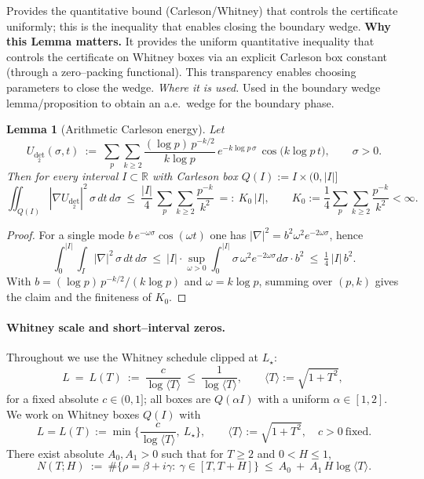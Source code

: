 \documentclass[11pt]{article}
\newtheorem{lemma}{Lemma}[section]
\theoremstyle{definition}
\theoremstyle{remark}
\newcommand{\R}{\mathbb{R}}
\begin{document}
\vspace{1.0cm}
Provides the quantitative bound (Carleson/Whitney) that controls the certificate uniformly;
this is the inequality that enables closing the boundary wedge.
\noindent\textbf{Why this Lemma matters.} It provides the uniform quantitative inequality that controls the certificate on Whitney boxes via an explicit Carleson box constant (through a zero--packing functional). This transparency enables choosing parameters to close the wedge.
\noindent\textit{Where it is used.} Used in the boundary wedge lemma/proposition to obtain an a.e.\ wedge for the boundary phase.
\begin{lemma}[Arithmetic Carleson energy]
\label{lem:carleson-arith}
Let
\[
 U_{\det_2}(\sigma,t)\ :=\ \sum_{p}\sum_{k\ge 2}\frac{(\log p)\,p^{-k/2}}{k\log p}\,e^{-k\log p\,\sigma}\,\cos\big(k\log p\,t\big),\qquad \sigma>0.
\]
Then for every interval $I\subset\R$ with Carleson box $Q(I):=I\times(0,|I|]$
\[
 \iint_{Q(I)} |\nabla U_{\det_2}|^2\,\sigma\,dt\,d\sigma\ \le\ \frac{|I|}{4}\,\sum_{p}\sum_{k\ge 2}\frac{p^{-k}}{k^2}
 \ =:\ K_0\,|I|,\qquad K_0:=\frac{1}{4}\sum_{p}\sum_{k\ge 2}\frac{p^{-k}}{k^2}<\infty.
\]
\end{lemma}
\begin{proof}
For a single mode $b\,e^{-\omega\sigma}\cos(\omega t)$ one has $|\nabla|^2=b^2\omega^2e^{-2\omega\sigma}$, hence
\[
 \int_0^{|I|}\!\int_I |\nabla|^2\,\sigma\,dt\,d\sigma\ \le\ |I|\cdot\sup_{\omega>0}\int_0^{|I|}\sigma\,\omega^2e^{-2\omega\sigma}d\sigma\cdot b^2\ \le\ \tfrac14\,|I|\,b^2.
\]
With $b=(\log p)\,p^{-k/2}/(k\log p)$ and $\omega=k\log p$, summing over $(p,k)$ gives the claim and the finiteness of $K_0$.
\end{proof}


\vspace{1.0cm}
\paragraph{Whitney scale and short–interval zeros.}
Throughout we use the Whitney schedule clipped at $L_\star$:
\[
  L\ =\ L(T)\ :=\ \frac{c}{\log\langle T\rangle}\ \le\ \frac{1}{\log\langle T\rangle},\qquad \langle T\rangle:=\sqrt{1+T^2},\
\]
for a fixed absolute $c\in(0,1]$; all boxes are $Q(\alpha I)$ with a uniform $\alpha\in[1,2]$.
We work on Whitney boxes $Q(I)$ with
\[
  L=L(T):=\min\Big\{\frac{c}{\log\langle T\rangle},\ L_\star\Big\},\qquad \langle T\rangle:=\sqrt{1+T^2},\quad c>0\ \text{fixed}.
\]
There exist absolute $A_0,A_1>0$ such that for $T\ge2$ and $0<H\le1$,
\[
  N(T;H)\ :=\ \#\{\rho=\beta+i\gamma:\ \gamma\in[T,T+H]\}\ \le\ A_0\ +\ A_1\,H\log\langle T\rangle.
  \]
\end{document}
